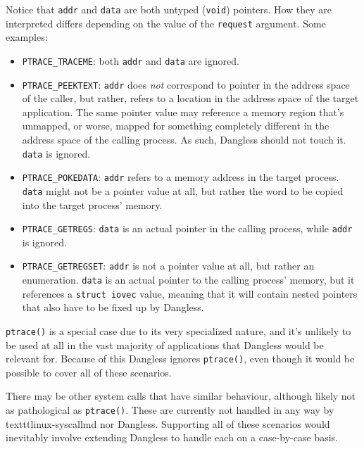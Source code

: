 Notice that \lstinline!addr! and \lstinline!data! are both untyped (\lstinline!void!) pointers. How they are interpreted differs depending on the value of the \lstinline!request! argument. Some examples:

\begin{itemize}
	\item \lstinline!PTRACE_TRACEME!: both \lstinline!addr! and \lstinline!data! are ignored.
	\item \lstinline!PTRACE_PEEKTEXT!: \lstinline!addr! does \emph{not} correspond to pointer in the address space of the caller, but rather, refers to a location in the address space of the target application. The same pointer value may reference a memory region that's unmapped, or worse, mapped for something completely different in the address space of the calling process. As such, Dangless should not touch it. \lstinline!data! is ignored.
	\item \lstinline!PTRACE_POKEDATA!: \lstinline!addr! refers to a memory address in the target process. \lstinline!data! might not be a pointer value at all, but rather the word to be copied into the target process' memory.
	\item \lstinline!PTRACE_GETREGS!: \lstinline!data! is an actual pointer in the calling process, while \lstinline!addr! is ignored.
	\item \lstinline!PTRACE_GETREGSET!: \lstinline!addr! is not a pointer value at all, but rather an enumeration. \lstinline!data! is an actual pointer to the calling process' memory, but it references a \lstinline!struct iovec! value, meaning that it will contain nested pointers that also have to be fixed up by Dangless.
\end{itemize}

\lstinline!ptrace()! is a special case due to its very specialized nature, and it's unlikely to be used at all in the vast majority of applications that Dangless would be relevant for. Because of this Dangless ignores \lstinline!ptrace()!, even though it would be possible to cover all of these scenarios.

There may be other system calls that have similar behaviour, although likely not as pathological as \lstinline!ptrace()!. These are currently not handled in any way by texttt{linux-syscallmd} nor Dangless. Supporting all of these scenarios would inevitably involve extending Dangless to handle each on a case-by-case basis.

